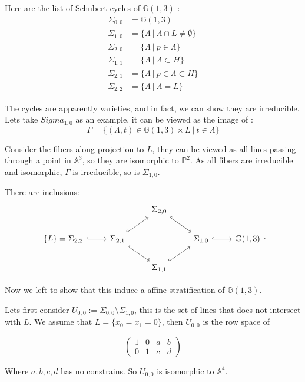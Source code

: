 \documentclass[12pt]{article}
\begin{document}
Here are the list of Schubert cycles of $\mathbb{G}(1,3)$ :
\begin{align*}
    \Sigma_{0,0} & =  \mathbb{G}(1,3)\\
    \Sigma_{1,0} & =   \{\Lambda \ | \ \Lambda \cap L \neq \emptyset\}  \\
    \Sigma_{2,0} & =  \{\Lambda \ | \ p \in \Lambda \}   \\
   \Sigma_{1,1} & =  \{\Lambda \ | \ \Lambda \subset H \}   \\
   \Sigma_{2,1} & =  \{\Lambda \ | \ p \in \Lambda \subset H\}\\
   \Sigma_{2,2} & =  \{\Lambda \ | \ \Lambda = L \}
\end{align*}


The cycles are apparently varieties, and in fact, we can show they are irreducible. Lets take $Sigma_{1,0}$ as an example, it can be viewed as the image of :
\[ \Gamma = \{(\Lambda, t) \in \mathbb{G}(1,3) \times L \ | \ t \in \Lambda \}\]

Consider the fibers along projection to $L$, they can be viewed as all lines passing through a point in $\mathbb{A}^{3}$, so they are isomorphic to $\mathbb{P}^{2}$. As all fibers are irreducible and isomorphic, $\Gamma$ is irreducible, so is $\Sigma_{1,0}$.

There are inclusions:
$$
\begin{tikzcd}
& & \Sigma_{2,0} \arrow[hookrightarrow]{dr} & & \\
\{L\} = \Sigma_{2,2} \arrow[hookrightarrow]{r} &\Sigma_{2,1} \arrow[hookrightarrow]{ur} \arrow[hookrightarrow]{dr} & & \Sigma_{1,0} \arrow[hookrightarrow]{r} &  \mathbb{G}(1,3) \\
& & \Sigma_{1,1} \arrow[hookrightarrow]{ur} & &
\end{tikzcd}.
$$

Now we left to show that this induce a affine stratification of $\mathbb{G}(1,3)$. 

Lets first consider  $U_{0,0} := \Sigma_{0,0} \setminus \Sigma_{1,0}$, this is the set of lines that does not intersect with $L$. We assume that $L = \{ x_{0} = x_{1}= 0\}$, then $U_{0,0}$ is the row space of

$$
\begin{pmatrix}
    1& 0 & a & b\\
    0& 1 & c & d
        
\end{pmatrix}
$$

Where $a,b,c,d $ has no constrains. So $U_{0,0}$ is isomorphic to $\mathbb{A}^{4}$.
\end{document}
